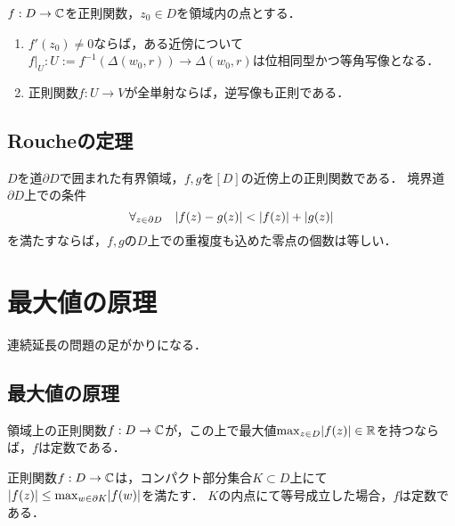 \documentclass[uplatex, dvipdfmx]{jsreport}
\begin{document}
\begin{corollary}
    $f:D\to \mathbb{C}$を正則関数，$z_0\in D$を領域内の点とする．
    \begin{enumerate}
        \item $f'(z_0)\ne0$ならば，ある近傍について$f|_{U}:U:=f^{-1}(\Delta(w_0,r))\to \Delta(w_0,r)$は位相同型かつ等角写像となる．
        \item 正則関数$f:U\to V$が全単射ならば，逆写像も正則である．
    \end{enumerate}
\end{corollary}

\subsection{Roucheの定理}

\begin{theorem}[Rouche]
    $D$を道$\partial D$で囲まれた有界領域，$f,g$を$[D]$の近傍上の正則関数である．
    境界道$\partial D$上での条件
    \[\forall_{z\in\partial D}\quad\lvert f(z)-g(z)\rvert<\lvert f(z)\rvert+\lvert g(z)\rvert\]
    を満たすならば，$f,g$の$D$上での重複度も込めた零点の個数は等しい．
\end{theorem}

\section{最大値の原理}

\begin{tcolorbox}[colframe=ForestGreen, colback=ForestGreen!10!white,breakable,colbacktitle=ForestGreen!40!white,coltitle=black,fonttitle=\bfseries\sffamily,
title=]
    連続延長の問題の足がかりになる．
\end{tcolorbox}

\subsection{最大値の原理}

\begin{theorem}
    領域上の正則関数$f:D\to\mathbb{C}$が，この上で最大値$\max_{z\in D}\lvert f(z)\rvert\in\mathbb{R}$を持つならば，$f$は定数である．
\end{theorem}

\begin{corollary}
    正則関数$f:D\to\mathbb{C}$は，コンパクト部分集合$K\subset D$上にて$\lvert f(z)\rvert\le\max_{w\in\partial K}\lvert f(w)\rvert$を満たす．
    $K$の内点にて等号成立した場合，$f$は定数である．
\end{corollary}
\end{document}
